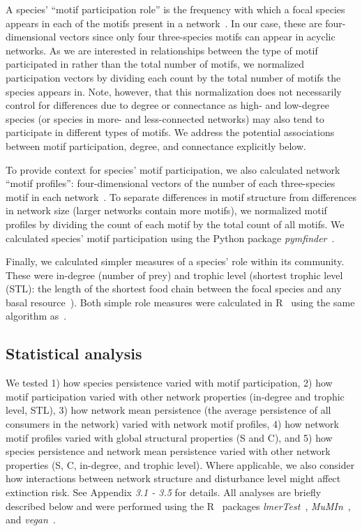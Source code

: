 \documentclass[12pt]{article}
\begin{document}
\begin{spacing}{2.0}
        A species' ``motif participation role'' is the frequency with which a focal species appears in each of the motifs present in a network~\citep{Stouffer2012}.
        In our case, these are four-dimensional vectors since only four three-species motifs can appear in acyclic networks.
        As we are interested in relationships between the type of motif participated in rather than the total number of motifs, we normalized participation vectors by dividing each count by the total number of motifs the species appears in.
        Note, however, that this normalization does not necessarily control for differences due to degree or connectance as high- and low-degree species (or species in more- and less-connected networks) may also tend to participate in different types of motifs.
        We address the potential associations between motif participation, degree, and connectance explicitly below. 
        
        
        To provide context for species' motif participation, we also calculated network ``motif profiles'': four-dimensional vectors of the number of each three-species motif in each network~\citep{Stouffer2012}.
        To separate differences in motif structure from differences in network size (larger networks contain more motifs), we normalized motif profiles by dividing the count of each motif by the total count of all motifs. 
		We calculated species' motif participation using the Python package \emph{pymfinder}~\citep{pymfinder}.


        Finally, we calculated simpler measures of a species' role within its community.
        These were in-degree (number of prey) and trophic level (shortest trophic level (STL): the length of the shortest food chain between the focal species and any basal resource~\citep{Williams2004}).
        Both simple role measures were calculated in R~\citep{R} using the same algorithm as~\citet{Eklof2013}.
        


	\subsection*{Statistical analysis} 

    	We tested 1) how species persistence varied with motif participation, 2) how motif participation varied with other network properties (in-degree and trophic level, STL), 3) how network mean persistence (the average persistence of all consumers in the network) varied with network motif profiles, 4) how network motif profiles varied with global structural properties (S and C), and 5) how species persistence and network mean persistence varied with other network properties (S, C, in-degree, and trophic level).
        Where applicable, we also consider how interactions between network structure and disturbance level might affect extinction risk.
    	See Appendix \emph{3.1 - 3.5} for details. 
    	All analyses are briefly described below and were performed using the R~\citep{R} packages \emph{lmerTest}~\citep{lmerTest}, \emph{MuMIn}~\citep{MuMIn}, and \emph{vegan}~\citep{vegan}.


\end{spacing}
\end{document}
